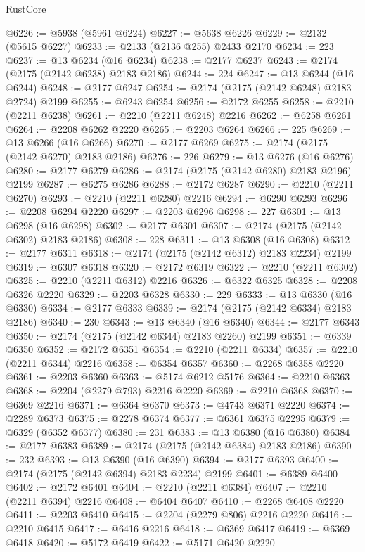 \begin{lexlean}{RustCore}
\begin{coremodule}
@6226 := @5938 (@5961 @6224)
@6227 := @5638 @6226
@6229 := @2132 (@5615 @6227)
@6233 := @2133 (@2136 @255) @2433 @2170
@6234 := 223
@6237 := @13 @6234 (@16 @6234)
@6238 := @2177 @6237
@6243 := @2174 (@2175 (@2142 @6238) @2183 @2186)
@6244 := 224
@6247 := @13 @6244 (@16 @6244)
@6248 := @2177 @6247
@6254 := @2174 (@2175 (@2142 @6248) @2183 @2724) @2199
@6255 := @6243 @6254
@6256 := @2172 @6255
@6258 := @2210 (@2211 @6238)
@6261 := @2210 (@2211 @6248) @2216
@6262 := @6258 @6261
@6264 := @2208 @6262 @2220
@6265 := @2203 @6264
@6266 := 225
@6269 := @13 @6266 (@16 @6266)
@6270 := @2177 @6269
@6275 := @2174 (@2175 (@2142 @6270) @2183 @2186)
@6276 := 226
@6279 := @13 @6276 (@16 @6276)
@6280 := @2177 @6279
@6286 := @2174 (@2175 (@2142 @6280) @2183 @2196) @2199
@6287 := @6275 @6286
@6288 := @2172 @6287
@6290 := @2210 (@2211 @6270)
@6293 := @2210 (@2211 @6280) @2216
@6294 := @6290 @6293
@6296 := @2208 @6294 @2220
@6297 := @2203 @6296
@6298 := 227
@6301 := @13 @6298 (@16 @6298)
@6302 := @2177 @6301
@6307 := @2174 (@2175 (@2142 @6302) @2183 @2186)
@6308 := 228
@6311 := @13 @6308 (@16 @6308)
@6312 := @2177 @6311
@6318 := @2174 (@2175 (@2142 @6312) @2183 @2234) @2199
@6319 := @6307 @6318
@6320 := @2172 @6319
@6322 := @2210 (@2211 @6302)
@6325 := @2210 (@2211 @6312) @2216
@6326 := @6322 @6325
@6328 := @2208 @6326 @2220
@6329 := @2203 @6328
@6330 := 229
@6333 := @13 @6330 (@16 @6330)
@6334 := @2177 @6333
@6339 := @2174 (@2175 (@2142 @6334) @2183 @2186)
@6340 := 230
@6343 := @13 @6340 (@16 @6340)
@6344 := @2177 @6343
@6350 := @2174 (@2175 (@2142 @6344) @2183 @2260) @2199
@6351 := @6339 @6350
@6352 := @2172 @6351
@6354 := @2210 (@2211 @6334)
@6357 := @2210 (@2211 @6344) @2216
@6358 := @6354 @6357
@6360 := @2268 @6358 @2220
@6361 := @2203 @6360
@6363 := @5174 @6212 @5176
@6364 := @2210 @6363
@6368 := @2204 (@2279 @793) @2216 @2220
@6369 := @2210 @6368
@6370 := @6369 @2216
@6371 := @6364 @6370
@6373 := @4743 @6371 @2220
@6374 := @2289 @6373
@6375 := @2278 @6374
@6377 := @6361 @6375 @2295
@6379 := @6329 (@6352 @6377)
@6380 := 231
@6383 := @13 @6380 (@16 @6380)
@6384 := @2177 @6383
@6389 := @2174 (@2175 (@2142 @6384) @2183 @2186)
@6390 := 232
@6393 := @13 @6390 (@16 @6390)
@6394 := @2177 @6393
@6400 := @2174 (@2175 (@2142 @6394) @2183 @2234) @2199
@6401 := @6389 @6400
@6402 := @2172 @6401
@6404 := @2210 (@2211 @6384)
@6407 := @2210 (@2211 @6394) @2216
@6408 := @6404 @6407
@6410 := @2268 @6408 @2220
@6411 := @2203 @6410
@6415 := @2204 (@2279 @806) @2216 @2220
@6416 := @2210 @6415
@6417 := @6416 @2216
@6418 := @6369 @6417
@6419 := @6369 @6418
@6420 := @5172 @6419
@6422 := @5171 @6420 @2220

\end{coremodule}
\end{lexlean}
